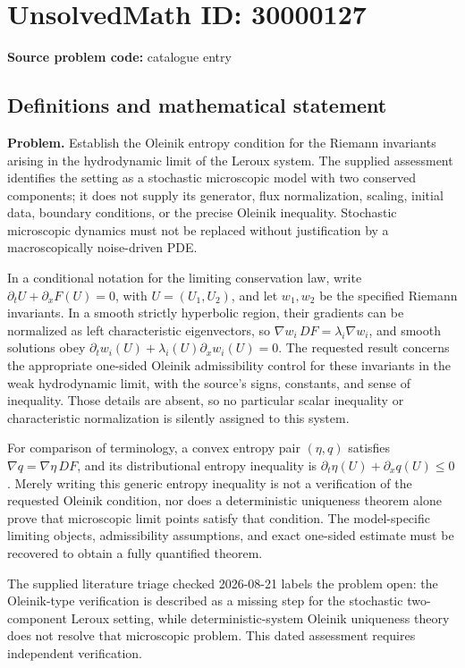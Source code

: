 \documentclass[11pt]{article}
\begin{document}
\section*{UnsolvedMath ID: 30000127}
\textbf{Source problem code:} catalogue entry
\subsection{Definitions and mathematical statement}
\textbf{Problem.} Establish the Oleinik entropy condition for the Riemann invariants arising in the hydrodynamic limit of the Leroux system. The supplied assessment identifies the setting as a stochastic microscopic model with two conserved components; it does not supply its generator, flux normalization, scaling, initial data, boundary conditions, or the precise Oleinik inequality. Stochastic microscopic dynamics must not be replaced without justification by a macroscopically noise-driven PDE.\par In a conditional notation for the limiting conservation law, write \(\partial_tU+\partial_xF(U)=0\), with \(U=(U_1,U_2)\), and let \(w_1,w_2\) be the specified Riemann invariants. In a smooth strictly hyperbolic region, their gradients can be normalized as left characteristic eigenvectors, so \(\nabla w_i\,DF=\lambda_i\nabla w_i\), and smooth solutions obey \(\partial_tw_i(U)+\lambda_i(U)\partial_xw_i(U)=0\). The requested result concerns the appropriate one-sided Oleinik admissibility control for these invariants in the weak hydrodynamic limit, with the source's signs, constants, and sense of inequality. Those details are absent, so no particular scalar inequality or characteristic normalization is silently assigned to this system.\par For comparison of terminology, a convex entropy pair \((\eta,q)\) satisfies \(\nabla q=\nabla\eta\,DF\), and its distributional entropy inequality is \(\partial_t\eta(U)+\partial_xq(U)\le0\). Merely writing this generic entropy inequality is not a verification of the requested Oleinik condition, nor does a deterministic uniqueness theorem alone prove that microscopic limit points satisfy that condition. The model-specific limiting objects, admissibility assumptions, and exact one-sided estimate must be recovered to obtain a fully quantified theorem.\par The supplied literature triage checked 2026-08-21 labels the problem open: the Oleinik-type verification is described as a missing step for the stochastic two-component Leroux setting, while deterministic-system Oleinik uniqueness theory does not resolve that microscopic problem. This dated assessment requires independent verification.
\end{document}
